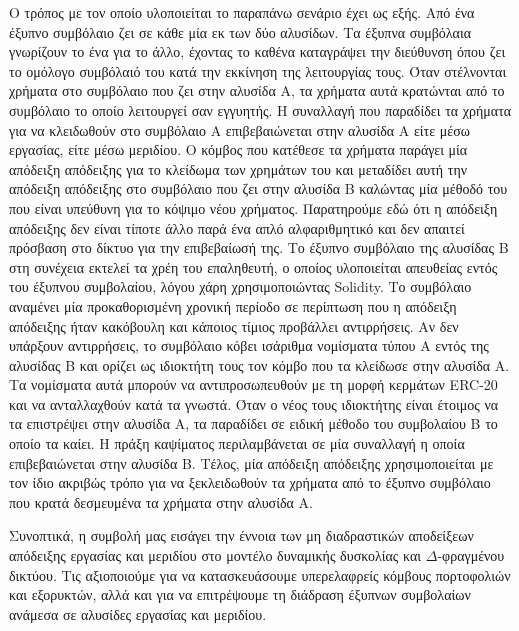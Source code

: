 Ο τρόπος με τον οποίο υλοποιείται το παραπάνω σενάριο έχει ως εξής. Από ένα έξυπνο συμβόλαιο ζει
σε κάθε μία εκ των δύο αλυσίδων. Τα έξυπνα συμβόλαια γνωρίζουν το ένα για το άλλο, έχοντας το
καθένα καταγράψει την διεύθυνση όπου ζει το ομόλογο συμβόλαιό του κατά την εκκίνηση της λειτουργίας
τους. Όταν στέλνονται χρήματα στο συμβόλαιο που ζει στην αλυσίδα Α, τα χρήματα αυτά κρατώνται
από το συμβόλαιο το οποίο λειτουργεί σαν εγγυητής. Η συναλλαγή που παραδίδει τα χρήματα για να
κλειδωθούν στο συμβόλαιο Α επιβεβαιώνεται στην αλυσίδα Α είτε μέσω εργασίας, είτε μέσω μεριδίου.
Ο κόμβος που κατέθεσε τα χρήματα παράγει μία απόδειξη απόδειξης για το κλείδωμα των χρημάτων
του και μεταδίδει αυτή την απόδειξη απόδειξης στο συμβόλαιο που ζει στην αλυσίδα Β καλώντας
μία μέθοδό του που είναι υπεύθυνη για το κόψιμο νέου χρήματος. Παρατηρούμε εδώ ότι η απόδειξη
απόδειξης δεν είναι τίποτε άλλο παρά ένα απλό αλφαριθμητικό και δεν απαιτεί πρόσβαση στο δίκτυο
για την επιβεβαίωσή της. Το έξυπνο συμβόλαιο της αλυσίδας Β στη συνέχεια εκτελεί τα χρέη του
επαληθευτή, ο οποίος υλοποιείται απευθείας εντός του έξυπνου συμβολαίου, λόγου χάρη χρησιμοποιώντας
Solidity. Το συμβόλαιο αναμένει μία προκαθορισμένη χρονική περίοδο σε περίπτωση που η απόδειξη
απόδειξης ήταν κακόβουλη και κάποιος τίμιος προβάλλει αντιρρήσεις. Αν δεν υπάρξουν αντιρρήσεις,
το συμβόλαιο κόβει ισάριθμα νομίσματα τύπου Α εντός της αλυσίδας Β και ορίζει ως ιδιοκτήτη τους
τον κόμβο που τα κλείδωσε στην αλυσίδα A. Τα νομίσματα αυτά μπορούν να αντιπροσωπευθούν με
τη μορφή κερμάτων ERC-20 και να ανταλλαχθούν κατά τα γνωστά. Όταν ο νέος τους ιδιοκτήτης είναι
έτοιμος να τα επιστρέψει στην αλυσίδα Α, τα παραδίδει σε ειδική μέθοδο του συμβολαίου Β το οποίο
τα καίει. Η πράξη καψίματος περιλαμβάνεται σε μία συναλλαγή η οποία επιβεβαιώνεται στην
αλυσίδα Β. Τέλος, μία απόδειξη απόδειξης χρησιμοποιείται με τον ίδιο ακριβώς τρόπο για να
ξεκλειδωθούν τα χρήματα από το έξυπνο συμβόλαιο που κρατά δεσμευμένα τα χρήματα στην αλυσίδα Α.

Συνοπτικά, η συμβολή μας εισάγει την έννοια των μη διαδραστικών αποδείξεων απόδειξης
εργασίας και μεριδίου στο μοντέλο δυναμικής δυσκολίας και $\Delta$-φραγμένου δικτύου.
Τις αξιοποιούμε για να κατασκευάσουμε υπερελαφρείς κόμβους πορτοφολιών
και εξορυκτών, αλλά και για να επιτρέψουμε τη διάδραση έξυπνων συμβολαίων ανάμεσα σε αλυσίδες
εργασίας και μεριδίου.
\clearpage
\fi
